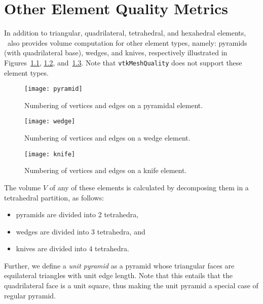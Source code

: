 \chapter{Other Element Quality Metrics\label{s:other-el}}

In addition to triangular, quadrilateral, tetrahedral, and hexahedral
elements, \verd\ also provides volume computation for other element
types, namely: pyramids (with quadrilateral base), wedges, and knives,
respectively illustrated
in Figures~\ref{f:pyr}, \ref{f:wed}, and~\ref{f:kni}. Note that
\texttt{vtkMeshQuality} does not support these element types. 

\begin{figure}[htb]
  \centering
  \texttt{[image: pyramid]}
  \caption{Numbering of vertices and edges on a pyramidal element.%
                                                                  \label{f:pyr}}
\end{figure}

\begin{figure}[htb]
  \centering
  \texttt{[image: wedge]}
  \caption{Numbering of vertices and edges on a wedge element.%
                                                                  \label{f:wed}}
\end{figure}

\begin{figure}[htb]
  \centering
  \texttt{[image: knife]}
  \caption{Numbering of vertices and edges on a knife element.%
                                                                  \label{f:kni}}
\end{figure}

The volume $V$ of any of these elements is calculated by decomposing them in
a tetrahedral partition, as follows:
\begin{itemize}
\item
pyramids are divided into 2 tetrahedra,
\item
wedges are divided into 3 tetrahedra, and
\item
knives are divided into 4 tetrahedra.
\end{itemize}

Further, we define a \emph{unit pyramid} as a pyramid whose triangular faces
are equilateral triangles with unit edge length. Note that this
entails that the quadrilateral face is a unit square, thus making the
unit pyramid a special case of regular pyramid.


